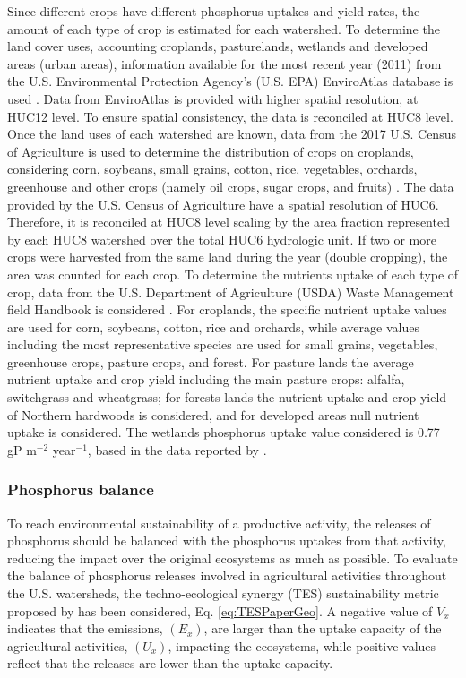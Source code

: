 \begin{refsection}[referencesCh3]
Since different crops have different phosphorus uptakes and yield rates, the amount of each type of crop is estimated for each watershed. To determine the land cover uses, accounting croplands, pasturelands, wetlands and developed areas (urban areas), information available for the most recent year (2011) from the U.S. Environmental Protection Agency's (U.S. EPA) EnviroAtlas database is used \citep{EnviroAtlas}. Data from EnviroAtlas is provided with higher spatial resolution, at HUC12 level. To ensure spatial consistency, the data is reconciled at HUC8 level. Once the land uses of each watershed are known, data from the 2017 U.S. Census of Agriculture is used to determine the distribution of crops on croplands, considering corn, soybeans, small grains, cotton, rice, vegetables, orchards, greenhouse and other crops (namely oil crops, sugar crops, and fruits) \citep{2017CensusofAgriculture}. The data provided by the U.S. Census of Agriculture have a spatial resolution of HUC6. Therefore, it is reconciled at HUC8 level scaling by the area fraction represented by each HUC8 watershed over the total HUC6 hydrologic unit. If two or more crops were harvested from the same land during the year (double cropping), the area was counted for each crop. To determine the nutrients uptake of each type of crop, data from the U.S. Department of Agriculture (USDA) Waste Management field Handbook is considered  \citep{USDAWaste}. For croplands, the specific nutrient uptake values are used for corn, soybeans, cotton, rice and orchards, while average values including the most representative species are used for small grains, vegetables, greenhouse crops, pasture crops, and forest. For pasture lands the average nutrient uptake and crop yield including the main pasture crops: alfalfa, switchgrass and wheatgrass; for forests lands the nutrient uptake and crop yield of Northern hardwoods is considered, and for developed areas null nutrient uptake is considered. The wetlands phosphorus uptake value considered is 0.77 gP m$^{-2}$ year$^{-1}$, based in the data reported by \citet{Kadlec}.

\subsubsection{Phosphorus balance}
To reach environmental sustainability of a productive activity, the releases of phosphorus should be balanced with the phosphorus uptakes from that activity, reducing the impact over the original ecosystems as much as possible. To evaluate the balance of phosphorus releases involved in agricultural activities throughout the U.S. watersheds, the techno-ecological synergy (TES) sustainability metric proposed by \citet{TESmetric} has been considered, Eq. \ref{eq:TESPaperGeo}. A negative value of $V_{x}$ indicates that the emissions, $\left(E_{x}\right)$, are larger than the uptake capacity of the agricultural activities, $\left(U_{x}\right)$, impacting the ecosystems, while positive values reflect that the releases are lower than the uptake capacity.


\end{refsection}
